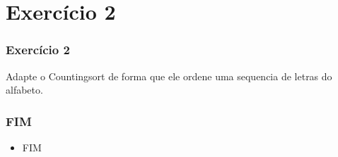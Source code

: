 \documentclass{beamer}
\begin{document}
\section{Exercício 2}

\begin{frame}
\frametitle{Exercício 2}
Adapte o Countingsort de forma que ele ordene uma sequencia de letras do alfabeto.
\end{frame}


\begin{frame}
  \frametitle{FIM}
\begin{itemize}
\item \alert{FIM}
\end{itemize}
\end{frame}	
\end{document}
